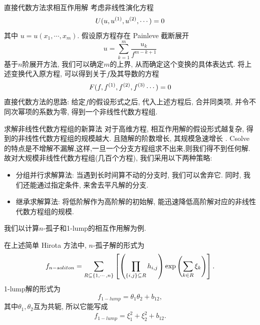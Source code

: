 
\begin{frame}{直接代数方法求相互作用解}
考虑非线性演化方程
\[
    U(u,u^{(1)},u^{(2)},\cdots)=0 
\]
其中 $u=u(x_1,\cdots,x_m)$. 假设原方程存在 Painleve 截断展开  
\[
    u=\sum_{k=1}^m{\frac{u_k}{f^{m-k+1}}}
\]
基于$n$阶展开方法, 我们可以确定$m$的上界, 从而确定这个变换的具体表达式. 将上述变换代入原方程, 可以得到关于$f$及其导数的方程
\[
    F(f,f^{(1)},f^{(2)},f^{(3)}\cdots)=0
\]
直接代数方法的思路: 给定$f$的假设形式之后, 代入上述方程后, 合并同类项, 并令不同次幂项的系数为零, 得到一个非线性代数方程组. 
\end{frame}

\begin{frame}{求解非线性代数方程组的新算法}
对于高维方程, 相互作用解的假设形式越复杂, 得到的非线性代数方程组的规模越大. 且随解的阶数增长, 其规模急速增长 . Csolve 的特点是不增解不漏解,这样,一旦一个分支方程组求不出来,则我们得不到任何解.故对大规模非线性代数方程组(几百个方程), 我们采用以下两种策略: 

\begin{itemize}
\item 分组并行求解算法: 当遇到长时间算不动的分支时, 我们可以舍弃它. 同时, 我们还能通过指定条件, 来舍去平凡解的分支.  
\item 继承求解算法: 将低阶解作为高阶解的初始解, 能迅速降低高阶解对应的非线性代数方程组的规模. 
\end{itemize}


\end{frame}

\begin{frame}
我们以计算$n$-孤子和1-lump的相互作用解为例.

在上述简单 Hirota 方法中, $n$-孤子解的形式为
\[
    f_{n-soliton}=\sum_{R\subseteq \left\{1,\cdots,n\right\}}\left[\left(\prod_{\left\{i,j\right\}\subseteq R}{h_{i,j}}\right)\exp\left(\sum_{k\in R}{\xi_k}\right)\right] . 
\]
1-lump解的形式为 
\[
    f_{1-lump}=\theta_1\theta_2+b_{12}, 
\]
其中$\theta_1,\theta_2$互为共轭, 所以它能写成
\[
    f_{1-lump}=\xi_1^2+\xi_2^2+b_{12} . 
\]
\end{frame}

